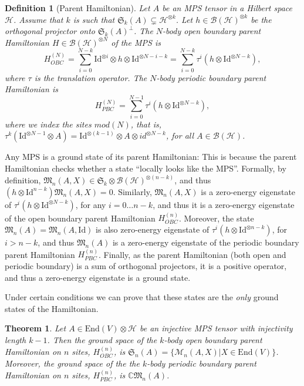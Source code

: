 \documentclass{article}
\newtheorem{theorem}{Theorem}
\newtheorem{definition}{Definition}
\newcommand{\id}{\mathrm{Id}}
\newcommand{\End}{\mathrm{End}}
\begin{document}
\begin{definition}[Parent Hamiltonian]
  Let $A$ be an MPS tensor in a Hilbert space $\mathcal{H}$. Assume that $k$ is such that $\mathfrak{S}_k(A)\subsetneq \mathcal{H}^{\otimes k}$. Let $h\in \mathcal{B}(\mathcal{H})^{\otimes k}$ be the orthogonal projector onto $\mathfrak{S}_k(A)^\perp$. The $N$-body open boundary \emph{parent Hamiltonian} $H\in\mathcal{B}(\mathcal{H})^{\otimes N}$ of the MPS is 
  \begin{equation*}
    H_{OBC}^{(N)} = \sum_{i=0}^{N-k} \id^{\otimes i} \otimes h \otimes \id^{\otimes N-i-k} = \sum_{i=0}^{N-k} \tau^i(h\otimes \id^{\otimes N-k}),
  \end{equation*}
  where $\tau$ is the translation operator. The $N$-body periodic boundary parent Hamiltonian is
  \begin{equation*}
    H_{PBC}^{(N)} = \sum_{i=0}^{N-1} \tau^i(h\otimes \id^{\otimes N-k}),
  \end{equation*}
  where we index the sites $mod(N)$, that is, $\tau^k (\id^{\otimes N-1} \otimes A) = \id^{\otimes (k-1)} \otimes A \otimes id^{\otimes N-k}$, for all $A\in\mathcal{B}(\mathcal{H})$.  
\end{definition}

Any MPS is a ground state of its parent Hamiltonian: This is because the parent Hamiltonian checks whether a state ``locally looks like the MPS''. Formally, by definition,  $\mathfrak{M}_n(A,X)\in \mathfrak{S}_k \otimes \mathcal{B}(\mathcal{H})^{\otimes (n-k)}$, and thus $(h\otimes \id^{n-k}) \mathfrak{M}_n(A,X) = 0$. Similarly,  $\mathfrak{M}_n(A,X)$ is a zero-energy eigenstate of $\tau^i(h\otimes \id^{\otimes N-k})$, for any $i=0\dots n-k$, and thus it is a zero-energy eigenstate of the open boundary parent Hamiltonian $H_{OBC}^{(n)}$.  Moreover, the state $\mathfrak{M}_n(A)= \mathfrak{M}_n(A,\id)$ is also zero-energy eigenstate of $\tau^i(h\otimes \id^{\otimes n-k})$, for $i>n-k$, and thus $\mathfrak{M}_n(A)$ is a zero-energy eigenstate of the periodic boundary parent Hamiltonian $H_{PBC}^{(n)}$. Finally, as the parent Hamiltonian (both open and periodic boundary) is a sum of orthogonal projectors, it is a positive operator, and thus a zero-energy eigenstate is a ground state.

Under certain conditions we can prove that these states are the \emph{only} ground states of the Hamiltonian.  

\begin{theorem}
  Let $A\in\End(V)\otimes \mathcal{H}$ be an \emph{injective} MPS tensor with injectivity length $k-1$. Then the ground space of the $k$-body open boundary parent Hamiltonian  on $n$ sites, $H_{OBC}^{(n)}$, is $\mathfrak{S}_n(A) = \{\mathcal{M}_n(A,X)|X\in \End(V)\}$. Moreover, the ground space of the the $k$-body periodic boundary parent Hamiltonian  on $n$ sites, $H_{PBC}^{(n)}$, is $\mathbb{C} \mathfrak{M}_n(A)$. 
\end{theorem}
\end{document}
